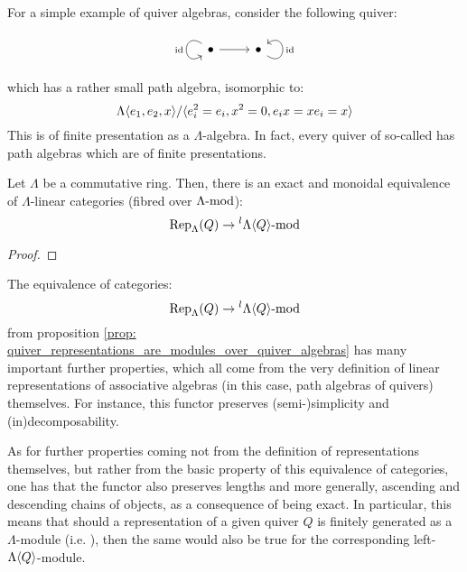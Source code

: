 \begin{example}
                For a simple example of quiver algebras, consider the following quiver:
                    $$
                        \begin{tikzcd}
                            \bullet \arrow["\id"', loop, distance=2em, in=215, out=145] \arrow[r] & \bullet \arrow["\id"', loop, distance=2em, in=35, out=325]
                        \end{tikzcd}
                    $$
                which has a rather small path algebra, isomorphic to:
                    $$\Lambda\<e_1, e_2, x\>/\<e_i^2 = e_i, x^2 = 0, e_i x = x e_i = x\>$$
                This is of finite presentation as a $\Lambda$-algebra. In fact, every quiver of so-called  has path algebras which are of finite presentations.
            \end{example}
            \begin{proposition} \label{prop: quiver_representations_are_modules_over_quiver_algebras}
                Let $\Lambda$ be a commutative ring. Then, there is an exact and monoidal equivalence of $\Lambda$-linear categories (fibred over $\Lambda\mod$):
                    $$\Rep_{\Lambda}(Q) \to {}^l\Lambda\<Q\>\mod$$
            \end{proposition}
                \begin{proof}
                    
                \end{proof}
            \begin{remark}
                The equivalence of categories:
                    $$\Rep_{\Lambda}(Q) \to {}^l\Lambda\<Q\>\mod$$
                from proposition \ref{prop: quiver_representations_are_modules_over_quiver_algebras} has many important further properties, which all come from the very definition of linear representations of associative algebras (in this case, path algebras of quivers) themselves. For instance, this functor preserves (semi-)simplicity and (in)decomposability.
                
                As for further properties coming not from the definition of representations themselves, but rather from the basic property of this equivalence of categories, one has that the functor also preserves lengths and more generally, ascending and descending chains of objects, as a consequence of being exact. In particular, this means that should a representation of a given quiver $Q$ is finitely generated as a $\Lambda$-module (i.e. ), then the same would also be true for the corresponding left-$\Lambda\<Q\>$-module.
            \end{remark}
                
